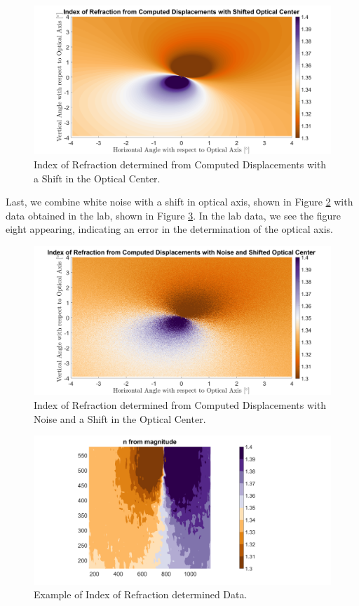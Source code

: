 \documentclass{article}
\begin{document}
\begin{figure}
\centering \includegraphics[width=\linewidth]{nfrommagndispshift.png}
\caption{Index of Refraction determined from Computed Displacements with a Shift in the Optical Center.}
\label{fig:nfrommagndispnoiseshift}
\end{figure}

Last, we combine white noise with a shift in optical axis, shown in Figure \ref{fig:nfrommagndispnoiseshift} with data obtained in the lab, shown in Figure \ref{fig:nfrommdataexample}. In the lab data, we see the figure eight appearing, indicating an error in the determination of the optical axis.  

\begin{figure}
\centering \includegraphics[width=\linewidth]{nfrommagndispnoiseshift.png}
\caption{Index of Refraction determined from Computed Displacements with Noise and a Shift in the Optical Center.}
\label{fig:nfrommagndispnoiseshift}
\end{figure}

\begin{figure}
\centering \includegraphics[width=\linewidth]{nfrommagndata.png}
\caption{Example of Index of Refraction determined Data.}
\label{fig:nfrommdataexample}
\end{figure}
\end{document}
